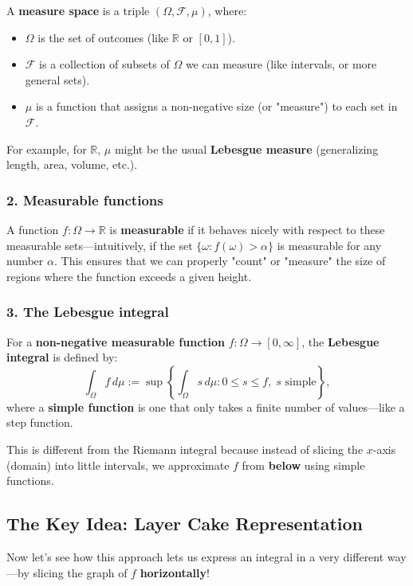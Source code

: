 \documentclass[11pt]{amsart}
\begin{document}
A \textbf{measure space} is a triple $(\Omega, \mathcal{F}, \mu)$, where:
\begin{itemize}
	\item $\Omega$ is the set of outcomes (like $\mathbb{R}$ or $[0,1]$).
	\item $\mathcal{F}$ is a collection of subsets of $\Omega$ we can measure (like intervals, or more general sets).
	\item $\mu$ is a function that assigns a non-negative size (or "measure") to each set in $\mathcal{F}$.
\end{itemize}
For example, for $\mathbb{R}$, $\mu$ might be the usual \textbf{Lebesgue measure} (generalizing length, area, volume, etc.).

\subsubsection*{2. Measurable functions}

A function $f: \Omega \to \mathbb{R}$ is \textbf{measurable} if it behaves nicely with respect to these measurable sets—intuitively, if the set $\{\omega: f(\omega) > \alpha\}$ is measurable for any number $\alpha$. This ensures that we can properly "count" or "measure" the size of regions where the function exceeds a given height.

\subsubsection*{3. The Lebesgue integral}

For a \textbf{non-negative measurable function} $f: \Omega \to [0, \infty]$, the \textbf{Lebesgue integral} is defined by:
\[
	\int_\Omega f \, d\mu := \sup \left\{ \int_\Omega s \, d\mu : 0 \leq s \leq f, \; s \text{ simple} \right\},
\]
where a \textbf{simple function} is one that only takes a finite number of values—like a step function.

This is different from the Riemann integral because instead of slicing the $x$-axis (domain) into little intervals, we approximate $f$ from \textbf{below} using simple functions.

\subsection*{The Key Idea: Layer Cake Representation}

Now let's see how this approach lets us express an integral in a very different way—by slicing the graph of $f$ \textbf{horizontally}!
\end{document}
